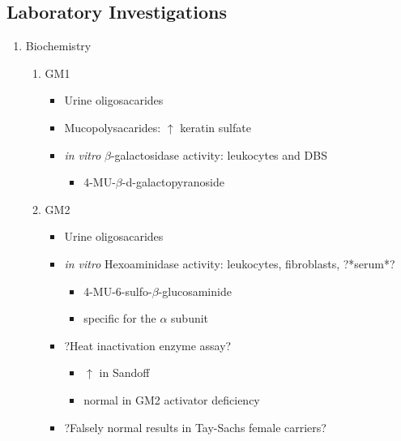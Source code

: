 \documentclass{scrartcl}
\begin{document}
\subsection{Laboratory Investigations}
\label{sec:orgc8d14bb}

\begin{enumerate}
\item Biochemistry
\label{sec:orgfe61885}

\begin{enumerate}
\item GM1
\label{sec:org5890de3}

\begin{itemize}
\item Urine oligosacarides
\item Mucopolysacarides: \(\uparrow\) keratin sulfate
\item \emph{in vitro} \(\beta\)-galactosidase activity: leukocytes and DBS
\begin{itemize}
\item 4-MU-\(\beta\)-d-galactopyranoside
\end{itemize}
\end{itemize}

\item GM2
\label{sec:org3f418c6}
\begin{itemize}
\item Urine oligosacarides
\item \emph{in vitro} Hexoaminidase activity: leukocytes, fibroblasts, ?*serum*?
\begin{itemize}
\item 4-MU-6-sulfo-\(\beta\)-glucosaminide
\item specific for the \(\alpha\) subunit
\end{itemize}
\item ?Heat inactivation enzyme assay?
\begin{itemize}
\item \(\uparrow\) in Sandoff
\item normal in GM2 activator deficiency
\end{itemize}

\item ?Falsely normal results in Tay-Sachs female carriers?
\end{itemize}
\end{enumerate}
\end{enumerate}
\end{document}
